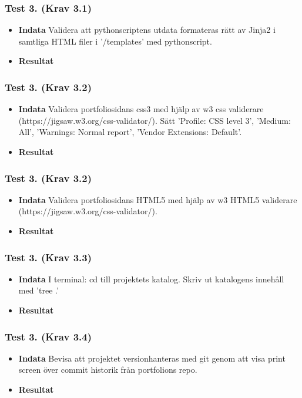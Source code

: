 \documentclass{TDP003mall}
\begin{document}
\subsubsection*{Test 3. (Krav 3.1)}
\begin{itemize}
\item[]\textbf{Indata} Validera att pythonscriptens utdata formateras rätt av Jinja2 i samtliga HTML filer i '/templates' med pythonscript.
\item[]\textbf{Resultat} 
\end{itemize}
\subsubsection*{Test 3. (Krav 3.2)}
\begin{itemize}%
\item[]\textbf{Indata} Validera portfoliosidans css3 med hjälp av w3 css validerare (https://jigsaw.w3.org/css-validator/). Sätt 'Profile: CSS level 3', 'Medium: All', 'Warnings: Normal report', 'Vendor Extensions: Default'.
\item[]\textbf{Resultat} 
\end{itemize}
\subsubsection*{Test 3. (Krav 3.2)}
\begin{itemize}%
\item[]\textbf{Indata} Validera portfoliosidans HTML5 med hjälp av w3 HTML5 validerare (https://jigsaw.w3.org/css-validator/). 
\item[]\textbf{Resultat} 
\end{itemize}
\subsubsection*{Test 3. (Krav 3.3)}
\begin{itemize}
\item[]\textbf{Indata} I terminal: cd till projektets katalog. Skriv ut katalogens innehåll med 'tree .'
\item[]\textbf{Resultat} 
\end{itemize}
\subsubsection*{Test 3. (Krav 3.4)}
\begin{itemize}
\item[]\textbf{Indata} Bevisa att projektet versionhanteras med git genom att visa print screen över commit historik från portfolions repo.
\item[]\textbf{Resultat} 
\end{itemize}
\end{document}
